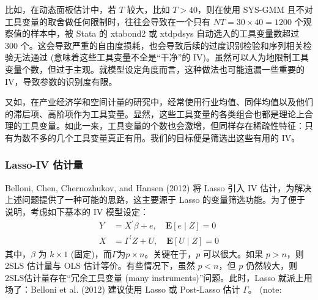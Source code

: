 {比如，在动态面板估计中，若 $T$ 较大，比如 $T>40$，则在使用 SYS-GMM 且不对工具变量的取舍做任何限制时，往往会导致在一个只有 $NT=30 \times 40 = 1200$ 个观察值的样本中，被 Stata 的 xtabond2 或 xtdpdsys 自动选入的工具变量数超过 300 个。这会导致严重的自由度损耗，也会导致后续的过度识别检验和序列相关检验无法通过 (意味着这些工具变量不全是“干净”的 IV)。虽然可以人为地限制工具变量个数，但过于主观。就模型设定角度而言，这种做法也可能遗漏一些重要的 IV，导致参数的识别度有限。

又如，在产业经济学和空间计量的研究中，经常使用行业均值、同伴均值以及他们的滞后项、高阶项作为工具变量。显然，这些工具变量的各类组合也都是理论上合理的工具变量。如此一来，工具变量的个数也会激增，但同样存在稀疏性特征：只有为数不多的几个工具变量真正有用。我们的目标便是筛选出这些有用的 IV。

\subsubsection{Lasso-IV 估计量}
Belloni, Chen, Chernozhukov, and Hansen (2012) 将 Lasso 引入 IV 估计，为解决上述问题提供了一种可能的思路，这主要源于 Lasso 的变量筛选功能。为了便于说明，考虑如下基本的 IV 模型设定：
\begin{equation}\label{eq:lasso-iv-01}
	\begin{aligned}
	Y &=X^{\prime} \beta+e,  \quad \mathbf{E}[e \mid Z] =0 \\
	X &=\Gamma^{\prime} Z+U, \quad \mathbf{E}[U \mid Z] =0
	\end{aligned}
\end{equation}
其中，$\beta$ 为 $k\times 1$ (固定)，而$\Gamma$为$p\times n$。关键在于，$p$ 可以很大。如果 $p>n$，则 2SLS 估计量与 OLS 估计等价。有些情况下，虽然 $p<n$，但 $p$ 仍然较大，则2SLS估计量存在“冗余工具变量 (many instruments)”问题。此时，Lasso 就派上用场了：Belloni et al. (2012) 建议使用 Lasso 或 Post-Lasso 估计 $\Gamma$。 (note: %

}
